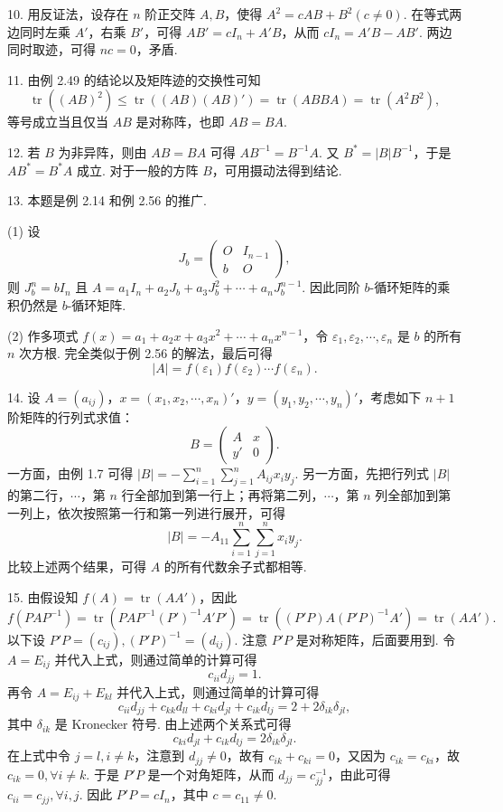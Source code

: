 \documentclass[UTF8,12pt,a4paper,fontset=fandol]{ctexart}
\begin{document}
10. 用反证法，设存在 $n$ 阶正交阵 $A,B$，使得 $A^2=cAB+B^2(c\ne0)$. 在等式两边同时左乘 $A'$，右乘 $B'$，可得 $AB'=cI_n+A'B$，从而 $cI_n=A'B-AB'$. 两边同时取迹，可得 $nc=0$，矛盾.

11. 由例 2.49 的结论以及矩阵迹的交换性可知
\[
\operatorname{tr}((AB)^2)\le \operatorname{tr}((AB)(AB)')
=\operatorname{tr}(ABBA)=\operatorname{tr}(A^2B^2),
\]
等号成立当且仅当 $AB$ 是对称阵，也即 $AB=BA$.

12. 若 $B$ 为非异阵，则由 $AB=BA$ 可得 $AB^{-1}=B^{-1}A$. 又 $B^*=|B|B^{-1}$，于是 $AB^*=B^*A$ 成立. 对于一般的方阵 $B$，可用摄动法得到结论.

13. 本题是例 2.14 和例 2.56 的推广.

(1) 设
\[
J_b=
\left(
\begin{array}{cc}
O & I_{n-1}\\
b & O
\end{array}
\right),
\]
则 $J_b^n=bI_n$ 且 $A=a_1I_n+a_2J_b+a_3J_b^2+\cdots+a_nJ_b^{n-1}$. 因此同阶 $b$-循环矩阵的乘积仍然是 $b$-循环矩阵.

(2) 作多项式 $f(x)=a_1+a_2x+a_3x^2+\cdots+a_nx^{n-1}$，令 $\varepsilon_1,\varepsilon_2,\cdots,\varepsilon_n$ 是 $b$ 的所有 $n$ 次方根. 完全类似于例 2.56 的解法，最后可得
\[
|A|=f(\varepsilon_1)f(\varepsilon_2)\cdots f(\varepsilon_n).
\]

14. 设 $A=(a_{ij})$，$x=(x_1,x_2,\cdots,x_n)'$，$y=(y_1,y_2,\cdots,y_n)'$，考虑如下 $n+1$ 阶矩阵的行列式求值：
\[
B=
\left(
\begin{array}{cc}
A & x\\
y' & 0
\end{array}
\right).
\]
一方面，由例 1.7 可得 $|B|=-\sum\limits_{i=1}^n\sum\limits_{j=1}^n A_{ij}x_iy_j$. 另一方面，先把行列式 $|B|$ 的第二行，$\cdots$，第 $n$ 行全部加到第一行上；再将第二列，$\cdots$，第 $n$ 列全部加到第一列上，依次按照第一行和第一列进行展开，可得
\[
|B|=-A_{11}\sum_{i=1}^n\sum_{j=1}^n x_iy_j.
\]
比较上述两个结果，可得 $A$ 的所有代数余子式都相等.

15. 由假设知 $f(A)=\operatorname{tr}(AA')$，因此
\[
f(PAP^{-1})=\operatorname{tr}(PAP^{-1}(P')^{-1}A'P')
=\operatorname{tr}((P'P)A(P'P)^{-1}A')
=\operatorname{tr}(AA').
\]
以下设 $P'P=(c_{ij}),(P'P)^{-1}=(d_{ij})$. 注意 $P'P$ 是对称矩阵，后面要用到. 令 $A=E_{ij}$ 并代入上式，则通过简单的计算可得
\[
c_{ii}d_{jj}=1.
\]
再令 $A=E_{ij}+E_{kl}$ 并代入上式，则通过简单的计算可得
\[
c_{ii}d_{jj}+c_{kk}d_{ll}+c_{ki}d_{jl}+c_{ik}d_{lj}=2+2\delta_{ik}\delta_{jl},
\]
其中 $\delta_{ik}$ 是 Kronecker 符号. 由上述两个关系式可得
\[
c_{ki}d_{jl}+c_{ik}d_{lj}=2\delta_{ik}\delta_{jl}.
\]
在上式中令 $j=l,i\ne k$，注意到 $d_{jj}\ne0$，故有 $c_{ik}+c_{ki}=0$，又因为 $c_{ik}=c_{ki}$，故 $c_{ik}=0,\forall i\ne k$. 于是 $P'P$ 是一个对角矩阵，从而 $d_{jj}=c_{jj}^{-1}$，由此可得 $c_{ii}=c_{jj},\forall i,j$. 因此 $P'P=cI_n$，其中 $c=c_{11}\ne0$.
\end{document}
